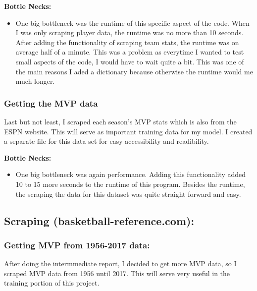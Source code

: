 \documentclass[11pt]{article}
\providecommand{\tightlist}{%
      \setlength{\itemsep}{0pt}\setlength{\parskip}{0pt}}
\begin{document}
\textbf{Bottle Necks:} \newline

\begin{itemize}
\tightlist
\item
  One big bottleneck was the runtime of this specific aspect of the
  code. When I was only scraping player data, the runtime was no more
  than 10 seconds. After adding the functionality of scraping team
  stats, the runtime was on average half of a minute. This was a problem
  as everytime I wanted to test small aspects of the code, I would have
  to wait quite a bit. This was one of the main reasons I aded a
  dictionary because otherwise the runtime would me much longer.
\end{itemize}

    \subsubsection{Getting the MVP data}\label{getting-the-mvp-data}

Last but not least, I scraped each season's MVP stats which is also from
the ESPN website. This will serve as important training data for my
model. I created a separate file for this data set for easy
accessibility and readibility. \newline

\textbf{Bottle Necks:}

\begin{itemize}
\tightlist
\item
  One big bottleneck was again performance. Adding this functionality
  added 10 to 15 more seconds to the runtime of this program. Besides
  the runtime, the scraping the data for this dataset was quite straight
  forward and easy.
\end{itemize}

    \subsection{Scraping
(basketball-reference.com):}\label{scraping-basketball-reference.com}

    \subsubsection{Getting MVP from 1956-2017
data:}\label{getting-mvp-from-1956-2017-data}

After doing the intermmediate report, I decided to get more MVP data, so
I scraped MVP data from 1956 until 2017. This will serve very useful in
the training portion of this project. \newline
\end{document}
